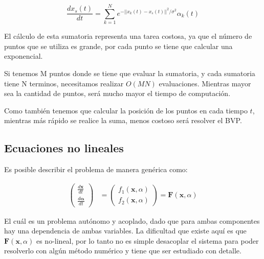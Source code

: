 \documentclass[letter, 10pt]{article}
\begin{document}
\begin{equation*}
\frac{d x_s(t)}{dt} = \displaystyle\sum_{k=1}^N e^{-|| x_k(t) - x_s(t)||^2 / \sigma^2} \alpha_k(t)
\end{equation*}
 
El cálculo de esta sumatoria representa una tarea costosa, ya que el número de puntos que se utiliza es grande, por cada punto se tiene que calcular una exponencial.

Si tenemos M puntos donde se tiene que evaluar la sumatoria, y cada sumatoria tiene N terminos, necesitamos realizar $O(MN)$ evaluaciones. Mientras mayor sea la cantidad de puntos, será mucho mayor el tiempo de computación.

Como también tenemos que calcular la posición de los puntos en cada tiempo $t$, mientras más rápido se realice la suma, menos costoso será resolver el BVP.


\subsection{Ecuaciones no lineales}

Es posible describir el problema de manera genérica como:

\begin{align}
\begin{pmatrix}
 \frac{d\mathbf{x}}{dt} \\
 \frac{d\mathbf{\alpha}}{dt}
\end{pmatrix}
& = 
\begin{pmatrix}
f_1(\mathbf{x}, \alpha) \\
f_2(\mathbf{x}, \alpha)
\end{pmatrix}
= \mathbf{F}(\mathbf{x}, \alpha) \label{edof}
\end{align}

 El cuál es un problema autónomo y acoplado, dado que para ambas componentes hay una dependencia de ambas variables. La dificultad que existe aquí es que $\mathbf{F}(\mathbf{x}, \alpha)$ es no-lineal, por lo tanto no es simple desacoplar el sistema para poder resolverlo con algún método numérico y  tiene que ser estudiado con detalle. 
 
\end{document}
